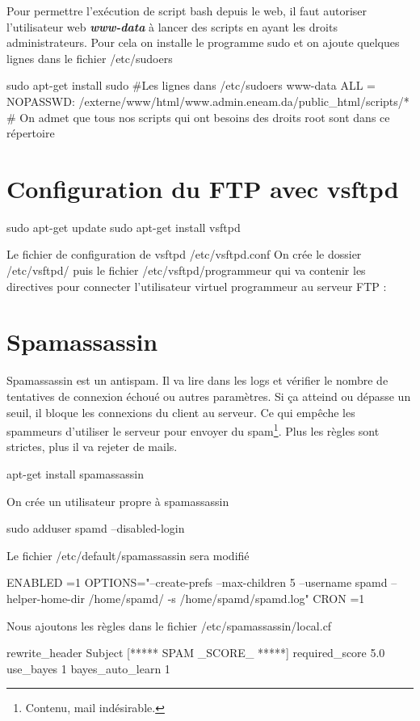 \documentclass[a4paper,12pt,french]{report} %
\begin{document}
Pour permettre l'exécution de script bash depuis le web, il faut autoriser l'utilisateur web \emph{\textbf{www-data}} à lancer des scripts en ayant les droits administrateurs. Pour cela on installe le programme sudo et on ajoute quelques lignes dans le fichier /etc/sudoers
\begin{exempleConsole}
sudo apt-get install sudo 
#Les lignes dans /etc/sudoers
www-data ALL = NOPASSWD: /externe/www/html/www.admin.eneam.da/public_html/scripts/*
# On admet que tous nos scripts qui ont besoins des droits root sont dans ce répertoire	
\end{exempleConsole}

\section{Configuration du FTP  avec vsftpd}
\begin{exempleConsole}
sudo apt-get update
sudo apt-get install vsftpd
\end{exempleConsole}
Le fichier de configuration de vsftpd /etc/vsftpd.conf
On crée le dossier /etc/vsftpd/ puis le fichier /etc/vsftpd/programmeur qui va contenir les directives pour connecter l'utilisateur virtuel programmeur au serveur FTP :
\section{Spamassassin}
Spamassassin est un antispam. Il va lire dans les logs et vérifier le nombre de tentatives de connexion échoué ou autres paramètres. Si ça atteind ou dépasse un seuil, il bloque les connexions du client au serveur. Ce qui empêche les spammeurs d'utiliser le serveur pour envoyer du spam\footnote{Contenu, mail indésirable.}. Plus les règles sont strictes, plus il va rejeter de mails. 
\begin{exempleConsole}
apt-get install spamassassin
\end{exempleConsole}
On crée un utilisateur propre à spamassassin
\begin{exempleConsole}
sudo adduser spamd --disabled-login
\end{exempleConsole}
Le fichier /etc/default/spamassassin sera modifié
\begin{exempleConsole}
ENABLED =1
OPTIONS="--create-prefs --max-children 5 --username spamd --helper-home-dir /home/spamd/ -s /home/spamd/spamd.log"
CRON =1
\end{exempleConsole}
Nous ajoutons les règles dans le fichier /etc/spamassassin/local.cf
\begin{exempleConsole}
rewrite_header Subject [***** SPAM _SCORE_ *****]
required_score 5.0
use_bayes 1
bayes_auto_learn 1
\end{exempleConsole}
\end{document}
